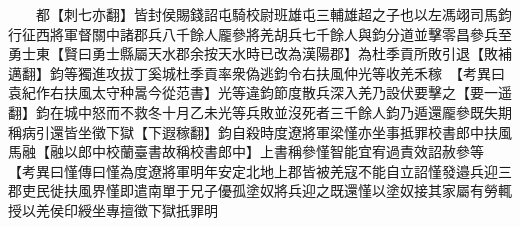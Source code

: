 　　都【刺七亦翻】皆封侯賜錢詔屯騎校尉班雄屯三輔雄超之子也以左馮翊司馬鈞行征西將軍督關中諸郡兵八千餘人龎參將羌胡兵七千餘人與鈞分道並擊零昌參兵至勇士東【賢曰勇士縣屬天水郡余按天水時已改為漢陽郡】為杜季貢所敗引退【敗補邁翻】鈞等獨進攻拔丁奚城杜季貢率衆偽逃鈞令右扶風仲光等收羌禾稼　【考異曰袁紀作右扶風太守种暠今從范書】光等違鈞節度散兵深入羌乃設伏要擊之【要一遥翻】鈞在城中怒而不救冬十月乙未光等兵敗並沒死者三千餘人鈞乃遁還龎參既失期稱病引還皆坐徵下獄【下遐稼翻】鈞自殺時度遼將軍梁慬亦坐事抵罪校書郎中扶風馬融【融以郎中校蘭臺書故稱校書郎中】上書稱參慬智能宜宥過責效詔赦參等　【考異曰慬傳曰慬為度遼將軍明年安定北地上郡皆被羌寇不能自立詔慬發邉兵迎三郡吏民徙扶風界慬即遣南單于兄子優孤塗奴將兵迎之既還慬以塗奴接其家屬有勞輒授以羌侯印綬坐專擅徵下獄扺罪明